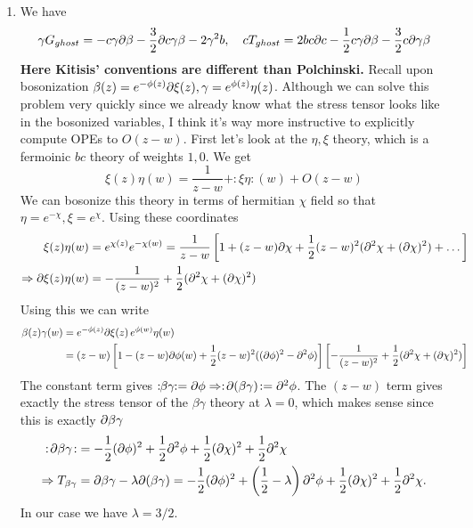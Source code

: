 \documentclass[11pt, class=article, crop=false]{standalone}
\begin{document}
\begin{enumerate}
	\item We have
	\[
		\gamma G_{ghost} = -c \gamma \partial \beta - \frac32 \partial c \gamma \beta - 2 \gamma^2 b, \quad c T_{ghost} = 2 b c \partial c - \frac12 c \gamma \partial \beta - \frac32 c \partial \gamma \beta
	\]
	\textbf{Here Kitisis' conventions are different than Polchinski.} Recall upon bosonization $\beta(z) = e^{-\phi(z)} \partial \xi(z), \gamma = e^{\phi(z)} \eta(z)$. 
	Although we can solve this problem very quickly since we already know what the stress tensor looks like in the bosonized variables, I think it's way more instructive to explicitly compute OPEs to $O(z-w)$. First let's look at the $\eta, \xi$ theory, which is a fermoinic $bc$ theory of weights $1, 0$. We get
	\[
		\xi(z) \eta(w) = \frac{1}{z-w} + :\xi \eta:(w) + O(z-w)
	\]
	We can bosonize this theory in terms of hermitian $\chi$ field so that $\eta = e^{-\chi}, \xi = e^{\chi}$. Using these coordinates
	\[
	\begin{aligned}
		\xi(z) \eta(w) &= e^{\chi(z)} e^{-\chi(w)} = \frac{1}{z-w} \left[1 + (z-w) \partial \chi + \frac12 (z-w)^2 (\partial^2 \chi + (\partial \chi)^2)  + \dots \right]\\
		\Rightarrow \partial \xi(z) \eta(w) &= -\frac{1}{(z-w)^2} + \frac12 (\partial^2 \chi + (\partial \chi)^2)
	\end{aligned}
	\]
	Using this we can write
	\[
	\begin{aligned}
		\beta(z) \gamma(w) &= e^{-\phi(z)} \partial \xi(z) \, e^{\phi(w)} \eta(w) \\
		&= (z-w) \left[1 - (z-w) \partial \phi(w) + \frac12 (z-w)^2 ((\partial\phi)^2 - \partial^2 \phi) \right] \left[-\frac{1}{(z-w)^2} + \frac12 (\partial^2 \chi + (\partial \chi)^2) \right]
	\end{aligned}
	\]
	The constant term gives $:\!\!\beta \gamma\!\!: = \partial \phi \Rightarrow :\!\partial(\beta \gamma)\!: = \partial^2 \phi$. The $(z-w)$ term gives exactly the stress tensor of the $\beta \gamma$ theory at $\lambda = 0$, which makes sense since this is exactly $\partial \beta \gamma$
	\[
	\begin{aligned}
		:\!\partial \beta \gamma\!: &= -\frac12 (\partial \phi)^2 + \frac12 \partial^2 \phi + \frac12 (\partial\chi)^2 + \frac12 \partial^2 \chi\\
		\Rightarrow 	T_{\beta \gamma } &= \partial \beta \gamma - \lambda \partial(\beta \gamma) = -\frac12 (\partial \phi)^2 + \left(\frac12 - \lambda\right) \partial^2 \phi + \frac12 (\partial\chi)^2 + \frac12 \partial^2 \chi.
	\end{aligned}
	\]
	In our case we have $\lambda = 3/2$. %
	\[
	\begin{aligned}

\end{aligned}\]
\end{enumerate}
\end{document}

